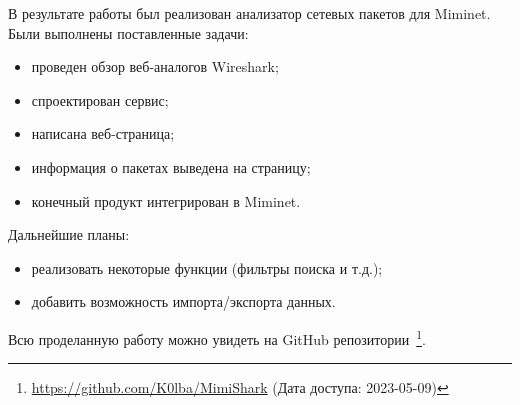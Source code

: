 

В результате работы был реализован анализатор сетевых пакетов для Miminet.
Были выполнены поставленные задачи:


\begin{itemize}
    \item  проведен обзор веб-аналогов Wireshark;
    \item  спроектирован сервис;
    \item  написана веб-страница;
    \item  информация о пакетах выведена на страницу;
    \item  конечный продукт интегрирован в Miminet.
\end{itemize}


Дальнейшие планы:
\begin{itemize}
    \item  реализовать некоторые функции (фильтры поиска и т.д.);
    \item  добавить возможность импорта/экспорта данных.
\end{itemize}



Всю проделанную работу можно увидеть на GitHub репозитории~\footnote{\url{https://github.com/K0lba/MimiShark} (Дата доступа: 2023-05-09)}.





